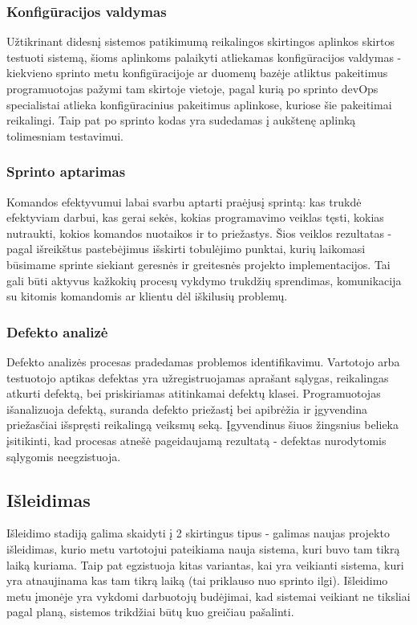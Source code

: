 \documentclass{VUMIFPSkursinis}
\begin{document}
	\subsubsection{Konfigūracijos valdymas}
	Užtikrinant didesnį sistemos patikimumą reikalingos skirtingos aplinkos skirtos testuoti sistemą, šioms aplinkoms palaikyti atliekamas konfigūracijos valdymas - kiekvieno sprinto metu konfigūracijoje ar duomenų bazėje atliktus pakeitimus programuotojas pažymi tam skirtoje vietoje, pagal kurią po sprinto devOps specialistai atlieka konfigūracinius pakeitimus aplinkose, kuriose šie pakeitimai reikalingi. Taip pat po sprinto kodas yra sudedamas į aukštenę aplinką tolimesniam testavimui.
	\subsubsection{Sprinto aptarimas}
	Komandos efektyvumui labai svarbu aptarti praėjusį sprintą: kas trukdė efektyviam darbui, kas gerai sekės, kokias programavimo veiklas tęsti, kokias nutraukti, kokios komandos nuotaikos ir to priežastys. Šios veiklos rezultatas - pagal išreikštus pastebėjimus išskirti tobulėjimo punktai, kurių laikomasi būsimame sprinte siekiant geresnės ir greitesnės projekto implementacijos. Tai gali būti aktyvus kažkokių procesų vykdymo trukdžių sprendimas, komunikacija su kitomis komandomis ar klientu dėl iškilusių problemų.
	\subsubsection{Defekto analizė}
	Defekto analizės procesas pradedamas problemos identifikavimu. Vartotojo arba testuotojo aptikas defektas yra užregistruojamas aprašant sąlygas, reikalingas atkurti defektą, bei priskiriamas atitinkamai defektų klasei. Programuotojas išanalizuoja defektą, suranda defekto priežastį bei apibrėžia ir įgyvendina priežasčiai išspręsti reikalingą veiksmų seką. Įgyvendinus šiuos žingsnius belieka įsitikinti, kad procesas atnešė pageidaujamą rezultatą - defektas nurodytomis sąlygomis neegzistuoja.

	\subsection{Išleidimas}
	Išleidimo stadiją galima skaidyti į 2 skirtingus tipus - galimas naujas projekto išleidimas, kurio metu vartotojui pateikiama nauja sistema, kuri buvo tam tikrą laiką kuriama. Taip pat egzistuoja kitas variantas, kai yra veikianti sistema, kuri yra atnaujinama kas tam tikrą laiką (tai priklauso nuo sprinto ilgi). Išleidimo metu įmonėje yra vykdomi darbuotojų budėjimai, kad sistemai veikiant ne tiksliai pagal planą, sistemos trikdžiai būtų kuo greičiau pašalinti.
\end{document}
